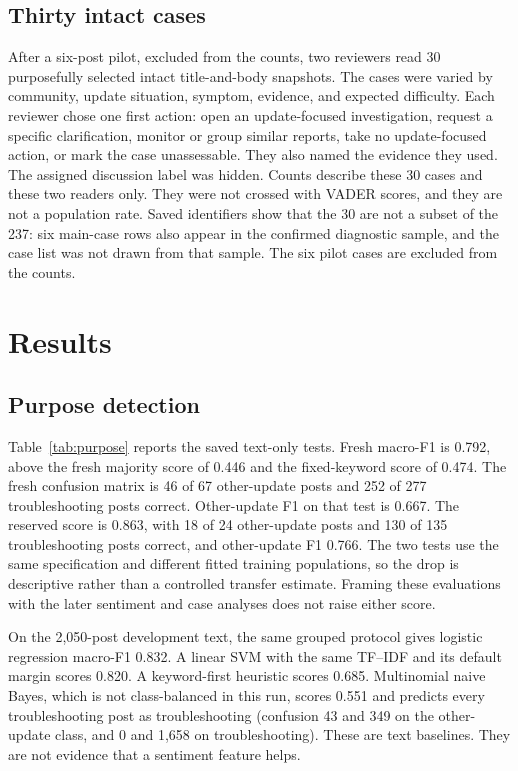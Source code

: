 \documentclass[conference,letterpaper]{IEEEtran}
\begin{document}
\subsection{Thirty intact cases}
After a six-post pilot, excluded from the counts, two reviewers read 30 purposefully selected intact title-and-body snapshots. The cases were varied by community, update situation, symptom, evidence, and expected difficulty. Each reviewer chose one first action: open an update-focused investigation, request a specific clarification, monitor or group similar reports, take no update-focused action, or mark the case unassessable. They also named the evidence they used. The assigned discussion label was hidden. Counts describe these 30 cases and these two readers only. They were not crossed with VADER scores, and they are not a population rate. Saved identifiers show that the 30 are not a subset of the 237: six main-case rows also appear in the confirmed diagnostic sample, and the case list was not drawn from that sample. The six pilot cases are excluded from the counts.

\section{Results}
\subsection{Purpose detection}
Table~\ref{tab:purpose} reports the saved text-only tests. Fresh macro-F1 is 0.792, above the fresh majority score of 0.446 and the fixed-keyword score of 0.474. The fresh confusion matrix is 46 of 67 other-update posts and 252 of 277 troubleshooting posts correct. Other-update F1 on that test is 0.667. The reserved score is 0.863, with 18 of 24 other-update posts and 130 of 135 troubleshooting posts correct, and other-update F1 0.766. The two tests use the same specification and different fitted training populations, so the drop is descriptive rather than a controlled transfer estimate. Framing these evaluations with the later sentiment and case analyses does not raise either score.

On the 2,050-post development text, the same grouped protocol gives logistic regression macro-F1 0.832. A linear SVM with the same TF--IDF and its default margin scores 0.820. A keyword-first heuristic scores 0.685. Multinomial naive Bayes, which is not class-balanced in this run, scores 0.551 and predicts every troubleshooting post as troubleshooting (confusion 43 and 349 on the other-update class, and 0 and 1,658 on troubleshooting). These are text baselines. They are not evidence that a sentiment feature helps.
\end{document}
